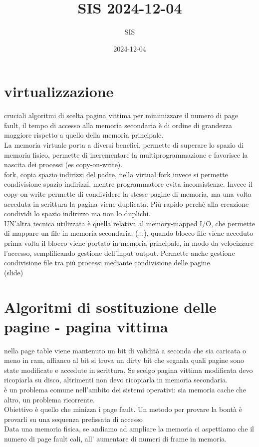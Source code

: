 \documentclass{article}
\title{SIS 2024-12-04}
\author{SIS}
\date{2024-12-04}
\begin{document}
\maketitle
\tableofcontents

\section{virtualizzazione}
cruciali algoritmi di scelta pagina vittima per minimizzare il numero di page fault, il tempo di accesso alla memoria secondaria
è di ordine di grandezza maggiore rispetto a quello della memoria principale.\\
La memoria virtuale porta a diversi benefici, permette di superare lo spazio di memoria fisico, permette di incrementare la 
multiprogrammazione e favorisce la nascita dei processi (es copy-on-write).\\
fork, copia spazio indirizzi del padre, nella virtual fork invece si permette condivisione spazio indirizzi, mentre 
programmatore evita inconsistenze. Invece il copy-on-write permette di condividere la stesse pagine di memoria, ma una volta acceduta in 
scrittura la pagina viene duplicata. Più rapido perché alla creazione condividi lo spazio indirizzo ma non lo duplichi.\\
UN'altra tecnica utilizzata è quella relativa al memory-mapped I/O, che permette di mappare un file in memoria secondaria, (...), 
quando blocco file viene acceduto prima volta il blocco viene portato in memoria principale, in modo da velocizzare l'accesso, semplificando 
gestione dell'input output. Permette anche gestione condivisione file tra più processi mediante condivisione delle pagine.\\
(slide)\\
\section{Algoritmi di sostituzione delle pagine - pagina vittima}
nella page table viene mantenuto un bit di validità a seconda che sia caricata o meno in ram, affianco al bit si 
trova un dirty bit che segnala quali pagine sono state modificate e accedute in scrittura. Se scelgo pagina vittima 
modificata devo ricopiarla su disco, altrimenti non devo ricopiarla in memoria secondaria.\\
è un problema comune nell'ambito dei sistemi operativi: sia memoria cache che altro, un problema ricorrente.\\
Obiettivo è quello che minizza i page fault. Un metodo per provare la bontà è provarli su una sequenza prefissata di accesso\\
Data una memoria fisica, se andiamo ad ampliare la memoria ci aspettiamo che il numero di page fault cali, all' 
aumentare di numeri di frame in memoria.\\
\end{document}
